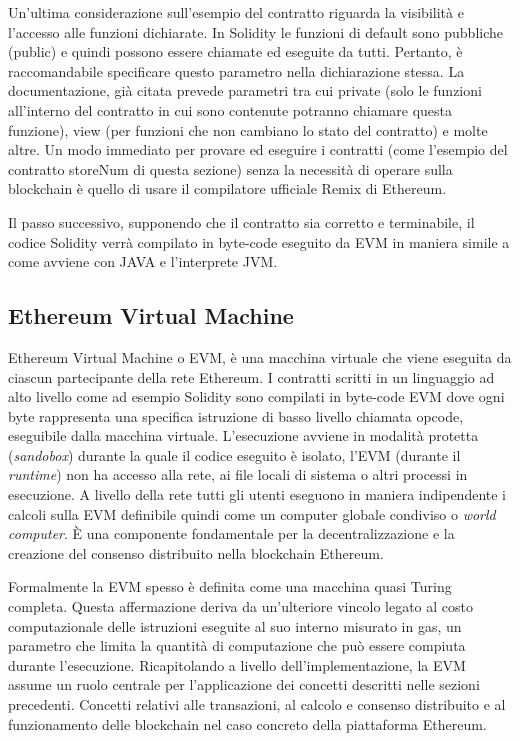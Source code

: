 Un’ultima considerazione sull’esempio del contratto riguarda la visibilità e l’accesso alle funzioni dichiarate. In Solidity le funzioni di default sono pubbliche (public) e quindi possono essere chiamate ed eseguite da tutti. Pertanto, è raccomandabile specificare questo parametro nella dichiarazione stessa. La documentazione, già citata prevede parametri tra cui private (solo le funzioni all’interno del contratto in cui sono contenute potranno chiamare questa funzione), view (per funzioni che non cambiano lo stato del contratto) e molte altre. Un modo immediato per provare ed eseguire i contratti (come l'esempio del contratto storeNum di questa sezione) senza la necessità di operare sulla blockchain è quello di usare il compilatore ufficiale Remix di Ethereum.

Il passo successivo, supponendo che il contratto sia corretto e terminabile, il codice Solidity verrà compilato in byte-code eseguito da EVM in maniera simile a come avviene con JAVA e l’interprete JVM.


\subsection{Ethereum Virtual Machine}

Ethereum Virtual Machine o EVM, è una macchina virtuale che viene eseguita da ciascun partecipante della rete Ethereum. I contratti scritti in un linguaggio ad alto livello come ad esempio Solidity sono compilati in byte-code EVM dove ogni byte rappresenta una specifica istruzione di basso livello chiamata opcode, eseguibile dalla macchina virtuale. L’esecuzione avviene in modalità protetta (\emph{sandobox}) durante la quale il codice eseguito è isolato, l’EVM (durante il \emph{runtime}) non ha accesso alla rete, ai file locali di sistema o altri processi in esecuzione. A livello della rete tutti gli utenti eseguono in maniera indipendente i calcoli sulla EVM definibile quindi come un computer globale condiviso o \emph{world computer}. È una componente fondamentale per la decentralizzazione e la creazione del consenso distribuito nella blockchain Ethereum.

Formalmente la EVM spesso è definita come una macchina quasi Turing completa. Questa affermazione deriva da un’ulteriore vincolo legato al costo computazionale delle istruzioni eseguite al suo interno misurato in gas, un parametro che limita la quantità di computazione che può essere compiuta durante l’esecuzione. Ricapitolando a livello dell'implementazione, la EVM assume un ruolo centrale per l'applicazione dei concetti descritti nelle sezioni precedenti. Concetti relativi alle transazioni, al calcolo e consenso distribuito e al funzionamento delle blockchain nel caso concreto della piattaforma Ethereum.

